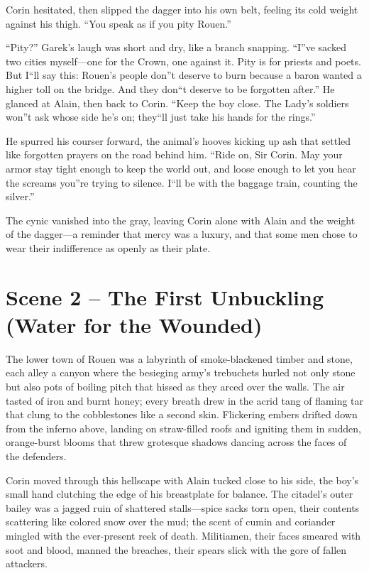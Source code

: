 \documentclass[11pt,twoside]{book}
\begin{document}
Corin hesitated, then slipped the dagger into his own belt, feeling its cold weight against his thigh. ``You speak as if you pity Rouen.''

``Pity?'' Garek's laugh was short and dry, like a branch snapping. ``I''ve sacked two cities myself---one for the Crown, one against it. Pity is for priests and poets. But I``ll say this: Rouen's people don''t deserve to burn because a baron wanted a higher toll on the bridge. And they don``t deserve to be forgotten after.'' He glanced at Alain, then back to Corin. ``Keep the boy close. The Lady's soldiers won''t ask whose side he's on; they``ll just take his hands for the rings.''

He spurred his courser forward, the animal's hooves kicking up ash that settled like forgotten prayers on the road behind him. ``Ride on, Sir Corin. May your armor stay tight enough to keep the world out, and loose enough to let you hear the screams you''re trying to silence. I``ll be with the baggage train, counting the silver.''

The cynic vanished into the gray, leaving Corin alone with Alain and the weight of the dagger---a reminder that mercy was a luxury, and that some men chose to wear their indifference as openly as their plate.

\section{Scene 2 -- The First Unbuckling (Water for the Wounded)}
The lower town of Rouen was a labyrinth of smoke-blackened timber and stone, each alley a canyon where the besieging army's trebuchets hurled not only stone but also pots of boiling pitch that hissed as they arced over the walls.  The air tasted of iron and burnt honey; every breath drew in the acrid tang of flaming tar that clung to the cobblestones like a second skin.  Flickering embers drifted down from the inferno above, landing on straw-filled roofs and igniting them in sudden, orange-burst blooms that threw grotesque shadows dancing across the faces of the defenders.

Corin moved through this hellscape with Alain tucked close to his side, the boy's small hand clutching the edge of his breastplate for balance.  The citadel's outer bailey was a jagged ruin of shattered stalls---spice sacks torn open, their contents scattering like colored snow over the mud; the scent of cumin and coriander mingled with the ever-present reek of death.  Militiamen, their faces smeared with soot and blood, manned the breaches, their spears slick with the gore of fallen attackers.
\end{document}
